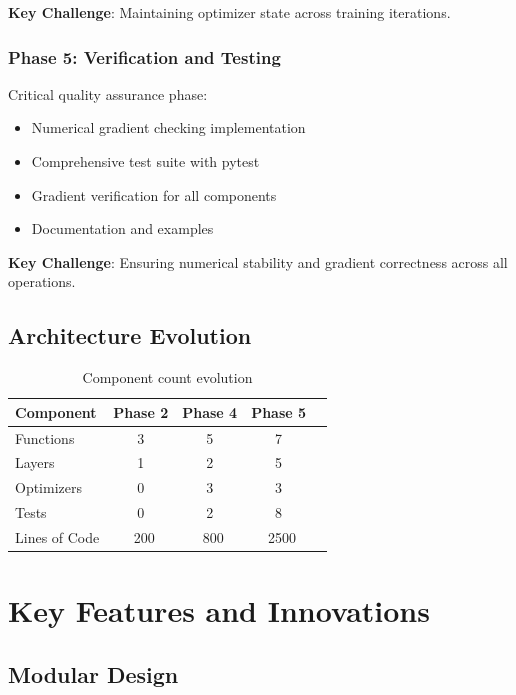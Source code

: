 \documentclass[12pt,a4paper]{article}
\begin{document}
\textbf{Key Challenge}: Maintaining optimizer state across training iterations.

\subsubsection{Phase 5: Verification and Testing}

Critical quality assurance phase:
\begin{itemize}
    \item Numerical gradient checking implementation
    \item Comprehensive test suite with pytest
    \item Gradient verification for all components
    \item Documentation and examples
\end{itemize}

\textbf{Key Challenge}: Ensuring numerical stability and gradient correctness across all operations.

\subsection{Architecture Evolution}

\begin{table}[h]
\centering
\caption{Component count evolution}
\begin{tabular}{@{}lcccc@{}}
\toprule
\textbf{Component} & \textbf{Phase 2} & \textbf{Phase 4} & \textbf{Phase 5} \\ \midrule
Functions & 3 & 5 & 7 \\
Layers & 1 & 2 & 5 \\
Optimizers & 0 & 3 & 3 \\
Tests & 0 & 2 & 8 \\
Lines of Code & ~200 & ~800 & ~2500 \\ \bottomrule
\end{tabular}
\end{table}

\section{Key Features and Innovations}

\subsection{Modular Design}
\end{document}
